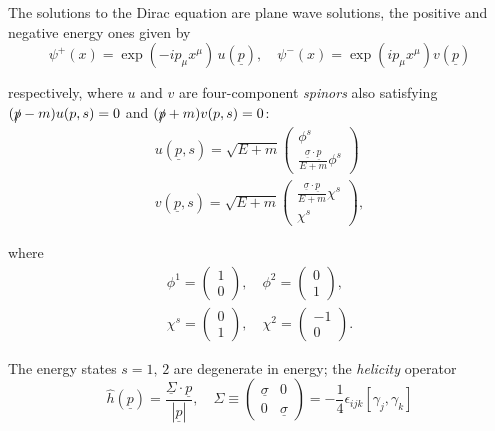 \documentclass{article}
\numberwithin{equation}{section}
\begin{document}
The solutions to the Dirac equation are plane wave solutions, the positive and negative energy ones given by
\begin{equation}
    \psi^+(x) = \exp(-ip_\mu x^\mu)\,u(\underline{p}), \quad \psi^-(x) = \exp(ip_\mu x^\mu) v(\underline{p})
\end{equation}

respectively, where $u$ and $v$ are four-component \textit{spinors} also satisfying $(\slashed{p}-m)u(p, s) = 0$ and $(\slashed{p} + m)v(p, s) = 0$:
\begin{gather}
    u(\underline{p}, s) = \sqrt{E+m} \begin{pmatrix}
        \phi^s \\ \frac{\underline{\sigma} \cdot \underline{p}}{E+m} \phi^s
    \end{pmatrix} \\
    v(\underline{p}, s) = \sqrt{E+m} \begin{pmatrix}
        \frac{\underline{\sigma} \cdot \underline{p}}{E+m} \chi^s \\ \chi^s
    \end{pmatrix},
\end{gather}

where 
\begin{gather}
    \phi^1 = \begin{pmatrix}
        1 \\ 0
    \end{pmatrix}, \quad \phi^2 = \begin{pmatrix}
        0 \\ 1
    \end{pmatrix}, \\
    \chi^s = \begin{pmatrix}
        0 \\ 1
    \end{pmatrix}, \quad \chi^2 = \begin{pmatrix}
        -1 \\ 0
    \end{pmatrix}.
\end{gather}

The energy states $s=1,\, 2$ are degenerate in energy; the \textit{helicity} operator
\begin{equation}
    \hat{h}(\underline{p}) = \frac{\underline{\Sigma} \cdot \underline{p}}{|\underline{p}|}, \quad \Sigma \equiv \begin{pmatrix}
        \underline{\sigma} & 0 \\ 0 & \underline{\sigma}
    \end{pmatrix} = -\frac{1}{4} \epsilon_{ijk} [\gamma_j, \gamma_k]
\end{equation}
\end{document}
